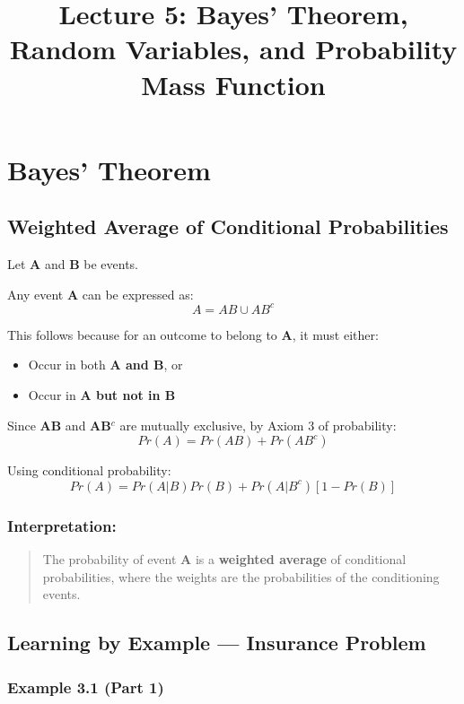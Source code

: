 \documentclass[12pt]{article}
\title{Lecture 5: Bayes’ Theorem, Random Variables, and Probability Mass Function}
\date{}
\begin{document}
\maketitle

\section{Bayes’ Theorem}

\subsection{Weighted Average of Conditional Probabilities}

Let \textbf{A} and \textbf{B} be events.

Any event \textbf{A} can be expressed as:
\[
A = AB \cup AB^c
\]

This follows because for an outcome to belong to \textbf{A}, it must either:

\begin{itemize}
\item Occur in both \textbf{A and B}, or
\item Occur in \textbf{A but not in B}
\end{itemize}

Since \textbf{AB} and \textbf{AB}$^{c}$ are mutually exclusive, by Axiom 3 of probability:
\[
Pr(A) = Pr(AB) + Pr(AB^c)
\]

Using conditional probability:
\[
Pr(A) = Pr(A|B)Pr(B) + Pr(A|B^c)[1 - Pr(B)]
\]

\subsubsection*{Interpretation:}

\begin{quote}
The probability of event \textbf{A} is a \textbf{weighted average} of conditional probabilities, where the weights are the probabilities of the conditioning events.
\end{quote}

\subsection{Learning by Example — Insurance Problem}

\subsubsection*{Example 3.1 (Part 1)}
\end{document}
